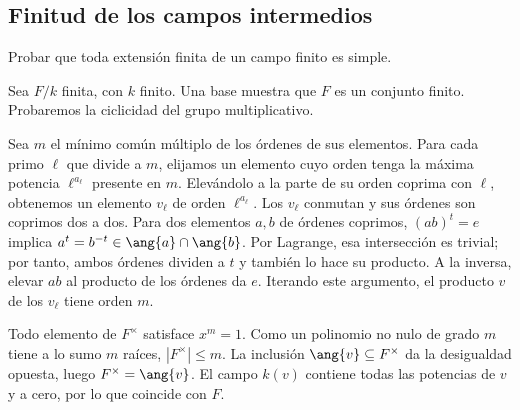 \subsection{Finitud de los campos intermedios}\label{tema:26-2-1}
\begin{ejer}\label{ejer:C26-campo-finito-simple}
Probar que toda extensión finita de un campo finito es simple.
\end{ejer}
\begin{sol}
Sea $F/k$ finita, con $k$ finito. Una base muestra que $F$ es un conjunto finito. Probaremos la ciclicidad del grupo multiplicativo.

Sea $m$ el mínimo común múltiplo de los órdenes de sus elementos. Para cada primo $\ell$ que divide a $m$, elijamos un elemento cuyo orden tenga la máxima potencia $\ell^{a_\ell}$ presente en $m$. Elevándolo a la parte de su orden coprima con $\ell$, obtenemos un elemento $v_\ell$ de orden $\ell^{a_\ell}$. Los $v_\ell$ conmutan y sus órdenes son coprimos dos a dos. Para dos elementos $a,b$ de órdenes coprimos, $(ab)^t=e$ implica $a^t=b^{-t}\in\ang{a}\cap\ang{b}$. Por Lagrange, esa intersección es trivial; por tanto, ambos órdenes dividen a $t$ y también lo hace su producto. A la inversa, elevar $ab$ al producto de los órdenes da $e$. Iterando este argumento, el producto $v$ de los $v_\ell$ tiene orden $m$.

Todo elemento de $F^\times$ satisface $x^m=1$. Como un polinomio no nulo de grado $m$ tiene a lo sumo $m$ raíces, $|F^\times|\leq m$. La inclusión $\ang{v}\subseteq F^\times$ da la desigualdad opuesta, luego $F^\times=\ang{v}$. El campo $k(v)$ contiene todas las potencias de $v$ y a cero, por lo que coincide con $F$.
\end{sol}

